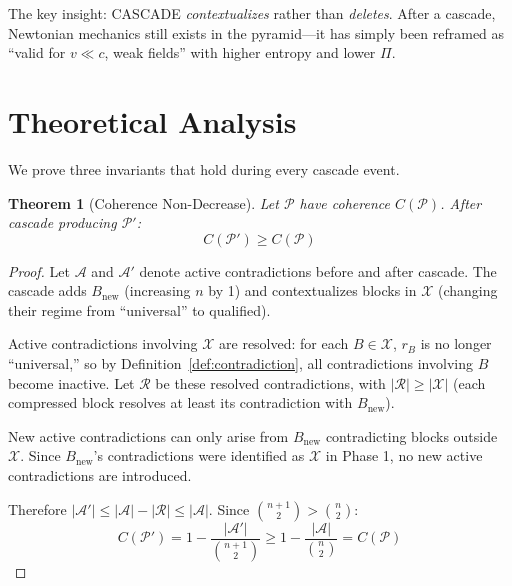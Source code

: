 \documentclass[11pt,a4paper]{article}
\newtheorem{theorem}{Theorem}[section]
\theoremstyle{definition}
\newcommand{\tp}{\Pi}
\begin{document}
The key insight: CASCADE \emph{contextualizes} rather than \emph{deletes}. After a cascade, Newtonian mechanics still exists in the pyramid---it has simply been reframed as ``valid for $v \ll c$, weak fields'' with higher entropy and lower $\tp$.

\section{Theoretical Analysis}\label{sec:theory}

We prove three invariants that hold during every cascade event.

\begin{theorem}[Coherence Non-Decrease]\label{thm:coherence}
Let $\mathcal{P}$ have coherence $C(\mathcal{P})$. After cascade producing $\mathcal{P}'$:
\begin{equation}
C(\mathcal{P}') \geq C(\mathcal{P})
\end{equation}
\end{theorem}
\begin{proof}
Let $\mathcal{A}$ and $\mathcal{A}'$ denote active contradictions before and after cascade. The cascade adds $B_{\text{new}}$ (increasing $n$ by 1) and contextualizes blocks in $\mathcal{X}$ (changing their regime from ``universal'' to qualified).

Active contradictions involving $\mathcal{X}$ are resolved: for each $B \in \mathcal{X}$, $r_B$ is no longer ``universal,'' so by Definition~\ref{def:contradiction}, all contradictions involving $B$ become inactive. Let $\mathcal{R}$ be these resolved contradictions, with $|\mathcal{R}| \geq |\mathcal{X}|$ (each compressed block resolves at least its contradiction with $B_{\text{new}}$).

New active contradictions can only arise from $B_{\text{new}}$ contradicting blocks outside $\mathcal{X}$. Since $B_{\text{new}}$'s contradictions were identified as $\mathcal{X}$ in Phase 1, no new active contradictions are introduced.

Therefore $|\mathcal{A}'| \leq |\mathcal{A}| - |\mathcal{R}| \leq |\mathcal{A}|$. Since $\binom{n+1}{2} > \binom{n}{2}$:
\begin{equation}
C(\mathcal{P}') = 1 - \frac{|\mathcal{A}'|}{\binom{n+1}{2}} \geq 1 - \frac{|\mathcal{A}|}{\binom{n}{2}} = C(\mathcal{P})
\end{equation}
\end{proof}
\end{document}
